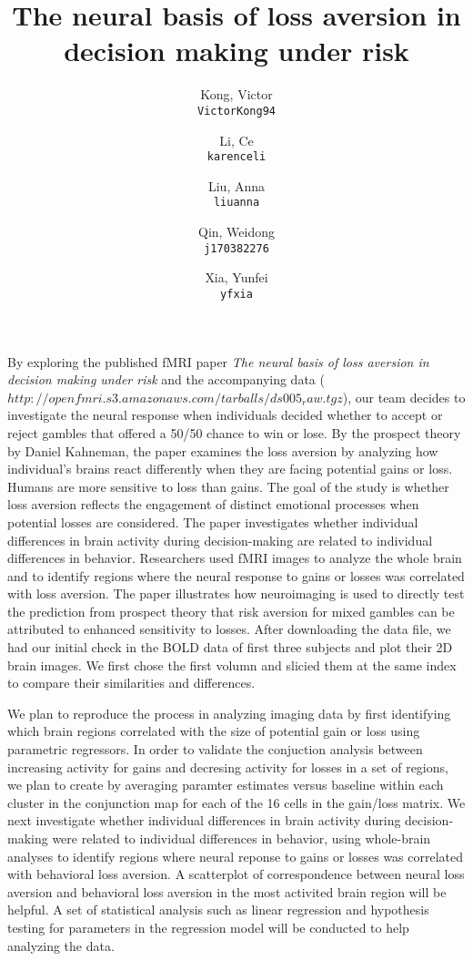 \documentclass[11pt]{article}
\title{The neural basis of loss aversion in decision making under risk}
\author{
  Kong, Victor\\
  \texttt{VictorKong94}
  \and
  Li, Ce\\
  \texttt{karenceli}
  \and
  Liu, Anna\\
  \texttt{liuanna}
  \and
  Qin, Weidong\\
  \texttt{j170382276}
  \and
  Xia, Yunfei\\
  \texttt{yfxia}
}
\begin{document}
\maketitle

By exploring the published fMRI paper \textit{The neural basis of loss aversion in decision making under risk} and the accompanying data ($http://openfmri.s3.amazonaws.com/tarballs/ds005_raw.tgz$), our team decides to investigate the neural response when individuals decided whether to accept or reject gambles that offered a 50/50 chance to win or lose. By the prospect theory by Daniel Kahneman, the paper examines the loss aversion by analyzing how individual's brains react differently when they are facing potential gains or loss. Humans are more sensitive to loss than gains. The goal of the study is whether loss aversion reflects the engagement of distinct emotional processes when potential losses are considered. The paper investigates whether individual differences in brain activity during decision-making are related to individual differences in behavior. Researchers used fMRI images to analyze the whole brain and to identify regions where the neural response to gains or losses was correlated with loss aversion. The paper illustrates how neuroimaging is used to directly test the prediction from prospect theory that risk aversion for mixed gambles can be attributed to enhanced sensitivity to losses. After downloading the data file, we had our initial check in the BOLD data of first three subjects and plot their 2D brain images. We first chose the first volumn and slicied them at the same index to compare their similarities and differences. 

We plan to reproduce the process in analyzing imaging data by first identifying which brain regions correlated with the size of potential gain or loss using parametric regressors. In order to validate the conjuction analysis between increasing activity for gains and decresing activity for losses in a set of regions, we plan to create by averaging paramter estimates versus baseline within each cluster in the conjunction map for each of the 16 cells in the gain/loss matrix. We next investigate whether individual differences in brain activity during decision-making were related to individual differences in behavior, using whole-brain analyses to identify regions where neural reponse to gains or losses was correlated with behavioral loss aversion. A scatterplot of correspondence between neural loss aversion and behavioral 
loss aversion in the most activited brain region will be helpful. A set of statistical analysis such as linear regression and hypothesis testing for parameters in the regression model will be conducted to help analyzing the data. 


\end{document}
